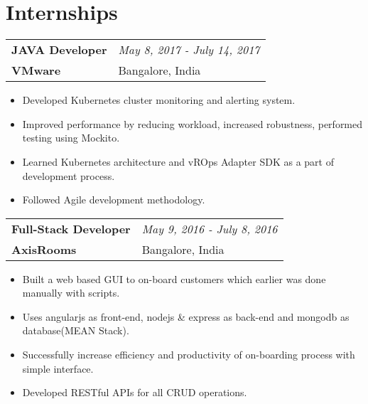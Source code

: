 \documentclass{article}
\begin{document}
\section{Internships}
\begin{tabularx}{\textwidth}{Xl}
    \textbf{JAVA Developer} & \textit{May 8, 2017 - July 14, 2017} \\
    \textbf{VMware} & Bangalore, India
\end{tabularx}
\begin{flushleft}
\begin{itemize}
	\vspace{-2mm} \setlength\itemsep{-0.5em}
    \item Developed Kubernetes cluster monitoring and alerting system.
    \item Improved performance by reducing workload, increased robustness, performed testing using Mockito.
    \item Learned Kubernetes architecture and vROps Adapter SDK as a part of development process.
    \item Followed Agile development methodology.
\end{itemize}
\end{flushleft}
\begin{tabularx}{\textwidth}{Xl}
    \textbf{Full-Stack Developer} & \textit{May 9, 2016 - July 8, 2016} \\
    \textbf{AxisRooms} & Bangalore, India
\end{tabularx}
\begin{flushleft}
\begin{itemize}
	\vspace{-2mm} \setlength\itemsep{-0.5em}
    \item Built a web based GUI to on-board customers which earlier was done manually with scripts. 
    \item Uses angularjs as front-end, nodejs \& express as back-end and mongodb as database(MEAN Stack).
    \item Successfully increase efficiency and productivity of on-boarding process with simple interface.
    \item Developed RESTful APIs for all CRUD operations.
\end{itemize}
\end{flushleft}
\vspace{-2mm}
\end{document}
